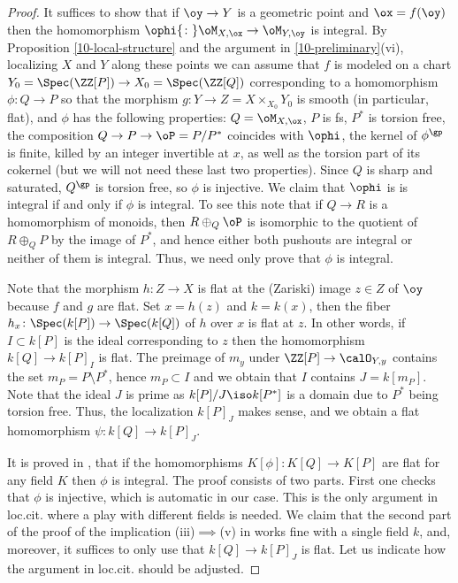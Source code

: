 \documentclass[10pt]{../fichiers-configuration-latex/smfart}
\begin{document}
\begin{proof}
It suffices to show that if $\oy\to Y$ is a geometric point and $\ox=f(\oy)$ then
the homomorphism $\ophi{\colon}\oM_{X,\ox}\to\oM_{Y,\oy}$ is integral. By Proposition
\ref{10-local-structure} and the argument in \ref{10-preliminary}(vi), localizing $X$
and $Y$ along these points we can assume that $f$ is modeled on a chart
$Y_0=\Spec(\ZZ[P])\to X_0=\Spec(\ZZ[Q])$ corresponding to a homomorphism
$\phi{\colon}Q\to P$ so that the morphism $g{\colon}Y\to Z=X\times_{X_0}Y_0$
is smooth (in particular, flat), and $\phi$ has the following properties:
$Q =\oM_{X,\ox}$, $P$ is fs, $P^*$ is torsion free, the composition
$Q\to P \to\oP = P/P^*$ coincides with $\ophi$, the kernel of $\phi^{\gp}$ is finite,
killed by an integer invertible at $x$, as well as the torsion part of its cokernel
(but we will not need these last two properties). Since $Q$ is sharp and saturated,
$Q^{\gp}$ is torsion free, so $\phi$ is injective. We claim that $\ophi$ is is integral
if and only if $\phi$ is integral. To see this note that if $Q\to R$ is a homomorphism
of monoids, then $R\oplus_Q\oP$ is isomorphic to the quotient of $R\oplus_Q P$ by the
image of $P^*$, and hence either both pushouts are integral or neither of them is integral.
Thus, we need only prove that $\phi$ is integral.

Note that the morphism $h{\colon}Z\to X$ is flat at the (Zariski) image $z\in Z$ of $\oy$
because $f$ and $g$ are flat. Set $x=h(z)$ and $k=k(x)$, then the fiber
$h_x{\colon}\Spec(k[P])\to\Spec(k[Q])$ of $h$ over $x$ is flat at $z$.
In other words, if $I\subset k[P]$ is the ideal corresponding to $z$ then
the homomorphism $k[Q]\to k[P]_I$ is flat. The preimage of $m_y$ under
$\ZZ[P]\to\calO_{Y,y}$ contains the set $m_P=P\setminus P^*$, hence $m_P\subset I$
and we obtain that $I$ contains $J=k[m_P]$. Note that the ideal $J$ is prime as
$k[P]/J\iso k[P^*]$ is a domain due to $P^*$ being torsion free. Thus, the
localization $k[P]_J$ makes sense, and we obtain a flat homomorphism $\psi{\colon}k[Q]\to k[P]_J$.

It is proved in \cite[4.1]{LSFI@Kato}, that if the homomorphisms $K[\phi]{\colon}K[Q]\to K[P]$
are flat for any field $K$ then $\phi$ is integral. The proof consists of two parts. First one
checks that $\phi$ is injective, which is automatic in our case. This is the only argument in
loc.cit. where a play with different fields is needed. We claim that the second part of the
proof of the implication (iii)$\implies$(v) in \cite[4.1]{LSFI@Kato} works fine with a single
field $k$, and, moreover, it suffices to only use that $k[Q]\to k[P]_J$ is flat. Let us indicate
how the argument in loc.cit. should be adjusted.


\end{proof}
\end{document}
